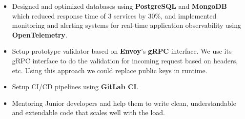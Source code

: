 \begin{itemize}
      \item Designed and optimized databases using \textbf{PostgreSQL} and \textbf{MongoDB} which reduced response time of 3 services by 30\%,
            and implemented monitoring and alerting systems for real-time application observability using \textbf{OpenTelemetry}.
      \item Setup prototype validator based on \textbf{Envoy}'s \textbf{gRPC} interface. We use its gRPC interface to do the validation for incoming request
            based on headers, etc. Using this approach we could replace public keys in runtime.
      \item Setup CI/CD pipelines using \textbf{GitLab CI}.
      \item Mentoring Junior developers and help them to write clean, understandable and extendable code that scales well with the load.
\end{itemize}

\vspace{0.5cm}

